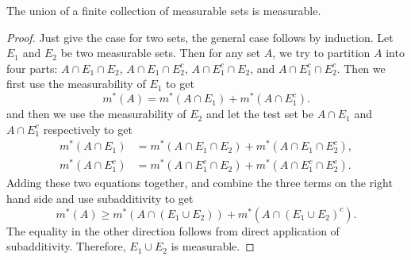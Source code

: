 \documentclass[../main.tex]{subfiles}
\begin{document}
\begin{proposition}{}{}
  The union of a finite collection of measurable sets is measurable.
\end{proposition}
\begin{proof}
  Just give the case for two sets, the general case follows by induction. Let $E_1$ and $E_2$ be two measurable sets. Then for any set $A$, we try to partition $A$ into four parts: $A \cap E_1 \cap E_2$, $A \cap E_1 \cap E_2^c$, $A \cap E_1^c \cap E_2$, and $A \cap E_1^c \cap E_2^c$. Then we first use the measurability of $E_1$ to get
  \begin{equation*}
    m^*(A) = m^*(A \cap E_1) + m^*(A \cap E_1^c).
  \end{equation*}
  and then we use the measurability of $E_2$ and let the test set be $A \cap E_1$ and $A \cap E_1^c$ respectively to get
  \begin{equation*}
    \begin{aligned}
      m^*(A \cap E_1) &= m^*(A \cap E_1 \cap E_2) + m^*(A \cap E_1 \cap E_2^c), \\
      m^*(A \cap E_1^c) &= m^*(A \cap E_1^c \cap E_2) + m^*(A \cap E_1^c \cap E_2^c).
    \end{aligned}
  \end{equation*}
  Adding these two equations together, and combine the three terms on the right hand side and use subadditivity to get
  \begin{equation*}
    m^*(A) \geq m^*(A \cap (E_1 \cup E_2)) + m^*(A \cap (E_1 \cup E_2)^c).
  \end{equation*}
  The equality in the other direction follows from direct application of subadditivity. Therefore, $E_1 \cup E_2$ is measurable.
\end{proof}
\end{document}
